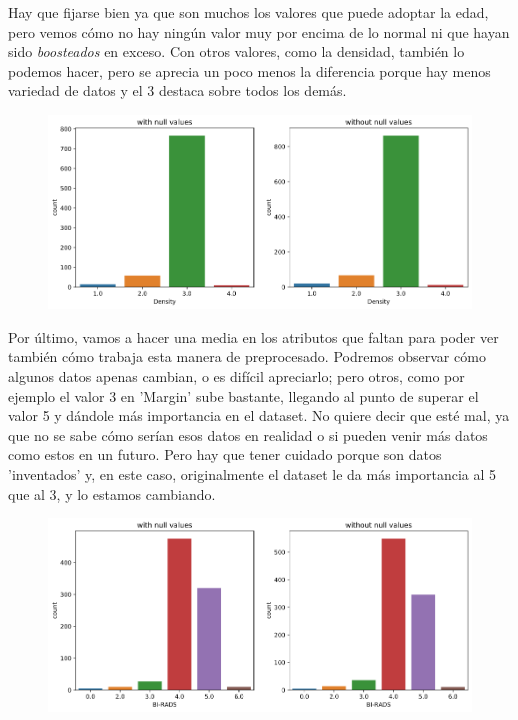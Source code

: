 \documentclass[11pt,a4paper]{article}
\begin{document}
Hay que fijarse bien ya que son muchos los valores que puede adoptar la edad, pero vemos cómo no hay ningún valor muy por encima de
lo normal ni que hayan sido \textit{boosteados} en exceso. Con otros valores, como la densidad, también lo podemos hacer, pero
se aprecia un poco menos la diferencia porque hay menos variedad de datos y el 3 destaca sobre todos los demás.
\begin{figure}[H]
    \centering
    \includegraphics[scale=0.35]{img/density-refill.png}
\end{figure}

Por último, vamos a hacer una media en los atributos que faltan para poder ver también cómo trabaja esta manera de preprocesado.
Podremos observar cómo algunos datos apenas cambian, o es difícil apreciarlo; pero otros, como por ejemplo el valor 3 en 'Margin'
sube bastante, llegando al punto de superar el valor 5 y dándole más importancia en el dataset. No quiere decir que esté mal, ya
que no se sabe cómo serían esos datos en realidad o si pueden venir más datos como estos en un futuro. Pero hay que tener cuidado
porque son datos 'inventados' y, en este caso, originalmente el dataset le da más importancia al 5 que al 3, y lo estamos cambiando.

\begin{figure}[H]
    \centering
    \includegraphics[scale=0.35]{img/birads-refill.png}
\end{figure}
\end{document}
